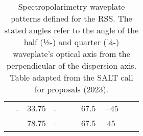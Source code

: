 \begin{table}[t]
\begin{tabular}{cccccccccc}
                                             & -                                       & $33.75$                                & -                                         &                                          &         & $67.5$ & $-45$   &        &         \\
                                             &                                         & $78.75$                                & -                                         &                                          &         & $67.5$ & ${ }45$ &        &         \\ \hline
    \end{tabular}
    \caption{Spectropolarimetry waveplate patterns defined for the \gls{RSS}. The stated angles refer to the angle of the half (½-) and quarter (¼-) waveplate's optical axis from the perpendicular of the dispersion axis. Table adapted from the \gls{SALT} call for proposals (2023).}
    \label{table:RSS_specpol_patterns}
\end{table}